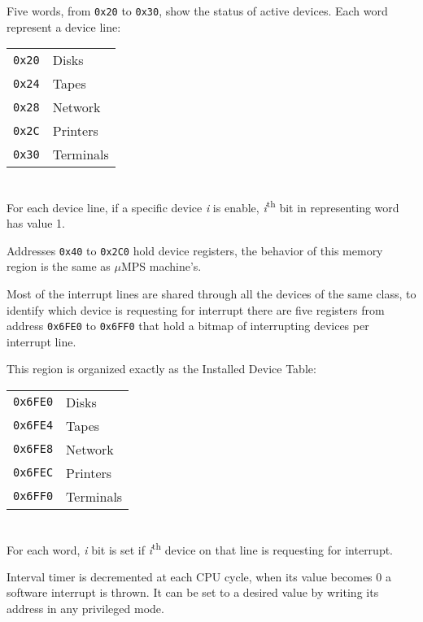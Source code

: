 \label{sec:man:device}

Five words, from \texttt{0x20} to \texttt{0x30}, show the status of active devices. Each word represent a device line:
\\

\begin{tabular}{r|l}
\texttt{0x20} & Disks \\
\texttt{0x24} & Tapes \\
\texttt{0x28} & Network \\
\texttt{0x2C} & Printers \\
\texttt{0x30} & Terminals \\
\end{tabular}
\\

For each device line, if a specific device \emph{i} is enable, \emph{i}\textsuperscript{th} bit in representing word has value 1.

Addresses \texttt{0x40} to \texttt{0x2C0} hold device registers, the behavior of this memory region is the same as $\mu$MPS machine's.

Most of the interrupt lines are shared through all the devices of the same class, to identify which device is requesting for interrupt there are five registers from address \texttt{0x6FE0} to \texttt{0x6FF0} that hold a bitmap of interrupting devices per interrupt line.

This region is organized exactly as the Installed Device Table:
\\

\begin{tabular}{r|l}
\texttt{0x6FE0} & Disks \\
\texttt{0x6FE4} & Tapes \\
\texttt{0x6FE8} & Network \\
\texttt{0x6FEC} & Printers \\
\texttt{0x6FF0} & Terminals \\
\end{tabular}
\\

For each word, \emph{i} bit is set if \emph{i}\textsuperscript{th} device on that line is requesting for interrupt.

\label{sec:man:intervalTimer}

Interval timer is decremented at each CPU cycle, when its value becomes 0 a software interrupt is thrown. It can be set to a desired value by writing its address in any privileged mode.


